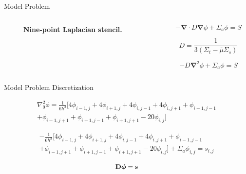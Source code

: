 \documentclass{beamer}
\begin{document}
\begin{frame}{Model Problem}

  \begin{columns}

    \begin{column}{0.5\textwidth}
      \begin{figure}[t!]
        \begin{center}
          \scalebox{0.75}{}
        \end{center}
        \caption{\textbf{Nine-point Laplacian stencil.}}
        \label{fig:stencil}
      \end{figure}
    \end{column}

    \begin{column}{0.5\textwidth}
      \begin{equation}
        -\boldsymbol{\nabla} \cdot D \boldsymbol{\nabla} \phi + \Sigma_a
        \phi = S
        \label{eq:diffusion_eq}
      \end{equation}

      \begin{equation}
        D = \frac{1}{3 ( \Sigma_t - \bar{\mu}\Sigma_s )}
        \label{eq:diffusion_coeff}
      \end{equation}

      \begin{equation}
        -D \boldsymbol{\nabla}^2 \phi + \Sigma_a \phi = S
        \label{eq:diffusion_eq_simple}
      \end{equation}
    \end{column}

  \end{columns}

\end{frame}

\begin{frame}{Model Problem Discretization}

\begin{multline}
  \nabla^2_9\phi = \frac{1}{6h^2}[4 \phi_{i-1,j} + 4 \phi_{i+1,j} + 4
    \phi_{i,j-1} + 4 \phi_{i,j+1} + \phi_{i-1,j-1}\\ + \phi_{i-1,j+1}
    + \phi_{i+1,j-1} + \phi_{i+1,j+1} - 20 \phi_{i,j}]
  \label{eq:nine_point_stencil}
\end{multline}

\begin{multline}
  -\frac{1}{6h^2}[4 \phi_{i-1,j} + 4 \phi_{i+1,j} + 4 \phi_{i,j-1} + 4
    \phi_{i,j+1} + \phi_{i-1,j-1}\\ + \phi_{i-1,j+1} + \phi_{i+1,j-1}
    + \phi_{i+1,j+1} - 20 \phi_{i,j}] + \Sigma_a \phi_{i,j} = s_{i,j}
  \label{eq:fd_system}
\end{multline}

\begin{equation}
  \mathbf{D}\boldsymbol{\phi}=\mathbf{s}
  \label{eq:operator_system}
\end{equation}

\end{frame}
\end{document}
